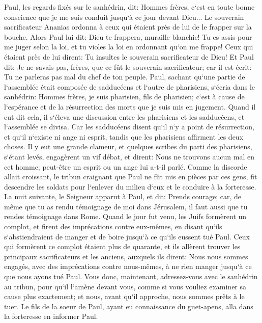 \verse Paul, les regards fixés sur le sanhédrin, dit: Hommes frères, c`est en toute bonne conscience que je me suis conduit jusqu`à ce jour devant Dieu... 
\verse Le souverain sacrificateur Ananias ordonna à ceux qui étaient près de lui de le frapper sur la bouche. 
\verse Alors Paul lui dit: Dieu te frappera, muraille blanchie! Tu es assis pour me juger selon la loi, et tu violes la loi en ordonnant qu`on me frappe! 
\verse Ceux qui étaient près de lui dirent: Tu insultes le souverain sacrificateur de Dieu! 
\verse Et Paul dit: Je ne savais pas, frères, que ce fût le souverain sacrificateur; car il est écrit: Tu ne parleras pas mal du chef de ton peuple. 
\verse Paul, sachant qu`une partie de l`assemblée était composée de sadducéens et l`autre de pharisiens, s`écria dans le sanhédrin: Hommes frères, je suis pharisien, fils de pharisien; c`est à cause de l`espérance et de la résurrection des morts que je suis mis en jugement. 
\verse Quand il eut dit cela, il s`éleva une discussion entre les pharisiens et les sadducéens, et l`assemblée se divisa. 
\verse Car les sadducéens disent qu`il n`y a point de résurrection, et qu`il n`existe ni ange ni esprit, tandis que les pharisiens affirment les deux choses. 
\verse Il y eut une grande clameur, et quelques scribes du parti des pharisiens, s`étant levés, engagèrent un vif débat, et dirent: Nous ne trouvons aucun mal en cet homme; peut-être un esprit ou un ange lui a-t-il parlé. 
\verse Comme la discorde allait croissant, le tribun craignant que Paul ne fût mis en pièces par ces gens, fit descendre les soldats pour l`enlever du milieu d`eux et le conduire à la forteresse. 
\verse La nuit suivante, le Seigneur apparut à Paul, et dit: Prends courage; car, de même que tu as rendu témoignage de moi dans Jérusalem, il faut aussi que tu rendes témoignage dans Rome. 
\verse Quand le jour fut venu, les Juifs formèrent un complot, et firent des imprécations contre eux-mêmes, en disant qu`ils s`abstiendraient de manger et de boire jusqu`à ce qu`ils eussent tué Paul. 
\verse Ceux qui formèrent ce complot étaient plus de quarante, 
\verse et ils allèrent trouver les principaux sacrificateurs et les anciens, auxquels ils dirent: Nous nous sommes engagés, avec des imprécations contre nous-mêmes, à ne rien manger jusqu`à ce que nous ayons tué Paul. 
\verse Vous donc, maintenant, adressez-vous avec le sanhédrin au tribun, pour qu`il l`amène devant vous, comme si vous vouliez examiner sa cause plus exactement; et nous, avant qu`il approche, nous sommes prêts à le tuer. 
\verse Le fils de la soeur de Paul, ayant eu connaissance du guet-apens, alla dans la forteresse en informer Paul. 
